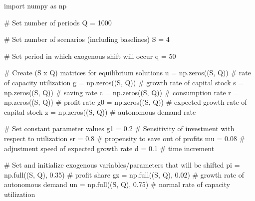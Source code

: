 \documentclass[
  letterpaper,
  DIV=11,
  numbers=noendperiod]{scrreprt}
\newenvironment{Shaded}{\begin{snugshade}}{\end{snugshade}}
\newcommand{\CommentTok}[1]{\textcolor[rgb]{0.37,0.37,0.37}{#1}}
\newcommand{\DecValTok}[1]{\textcolor[rgb]{0.68,0.00,0.00}{#1}}
\newcommand{\FloatTok}[1]{\textcolor[rgb]{0.68,0.00,0.00}{#1}}
\newcommand{\ImportTok}[1]{\textcolor[rgb]{0.00,0.46,0.62}{#1}}
\newcommand{\NormalTok}[1]{\textcolor[rgb]{0.00,0.23,0.31}{#1}}
\newcommand{\OperatorTok}[1]{\textcolor[rgb]{0.37,0.37,0.37}{#1}}
\begin{document}
\begin{tcolorbox}[enhanced jigsaw, titlerule=0mm, breakable, bottomrule=.15mm, toprule=.15mm, colbacktitle=quarto-callout-note-color!10!white, rightrule=.15mm, toptitle=1mm, opacityback=0, left=2mm, coltitle=black, title=\textcolor{quarto-callout-note-color}{\faInfo}\hspace{0.5em}{Python code}, colframe=quarto-callout-note-color-frame, opacitybacktitle=0.6, leftrule=.75mm, bottomtitle=1mm, arc=.35mm, colback=white]

\begin{Shaded}
\begin{Highlighting}[]
\ImportTok{import}\NormalTok{ numpy }\ImportTok{as}\NormalTok{ np}

\CommentTok{\# Set number of periods}
\NormalTok{Q }\OperatorTok{=} \DecValTok{1000}

\CommentTok{\# Set number of scenarios (including baselines)}
\NormalTok{S }\OperatorTok{=} \DecValTok{4}

\CommentTok{\# Set period in which exogenous shift will occur}
\NormalTok{q }\OperatorTok{=} \DecValTok{50}

\CommentTok{\# Create (S x Q) matrices for equilibrium solutions}
\NormalTok{u }\OperatorTok{=}\NormalTok{ np.zeros((S, Q))  }\CommentTok{\# rate of capacity utilization}
\NormalTok{g }\OperatorTok{=}\NormalTok{ np.zeros((S, Q))  }\CommentTok{\# growth rate of capital stock}
\NormalTok{s }\OperatorTok{=}\NormalTok{ np.zeros((S, Q))  }\CommentTok{\# saving rate}
\NormalTok{c }\OperatorTok{=}\NormalTok{ np.zeros((S, Q))  }\CommentTok{\# consumption rate}
\NormalTok{r }\OperatorTok{=}\NormalTok{ np.zeros((S, Q))  }\CommentTok{\# profit rate}
\NormalTok{g0 }\OperatorTok{=}\NormalTok{ np.zeros((S, Q))  }\CommentTok{\# expected growth rate of capital stock}
\NormalTok{z }\OperatorTok{=}\NormalTok{ np.zeros((S, Q))  }\CommentTok{\# autonomous demand rate}

\CommentTok{\# Set constant parameter values}
\NormalTok{g1 }\OperatorTok{=} \FloatTok{0.2}  \CommentTok{\# Sensitivity of investment with respect to utilization}
\NormalTok{sr }\OperatorTok{=} \FloatTok{0.8}  \CommentTok{\# propensity to save out of profits}
\NormalTok{mu }\OperatorTok{=} \FloatTok{0.08}  \CommentTok{\# adjustment speed of expected growth rate}
\NormalTok{d }\OperatorTok{=} \FloatTok{0.1}   \CommentTok{\# time increment}

\CommentTok{\# Set and initialize exogenous variables/parameters that will be shifted}
\NormalTok{pi }\OperatorTok{=}\NormalTok{ np.full((S, Q), }\FloatTok{0.35}\NormalTok{)  }\CommentTok{\# profit share}
\NormalTok{gz }\OperatorTok{=}\NormalTok{ np.full((S, Q), }\FloatTok{0.02}\NormalTok{)  }\CommentTok{\# growth rate of autonomous demand}
\NormalTok{un }\OperatorTok{=}\NormalTok{ np.full((S, Q), }\FloatTok{0.75}\NormalTok{)  }\CommentTok{\# normal rate of capacity utilization}


\end{Highlighting}
\end{Shaded}
\end{tcolorbox}
\end{document}
